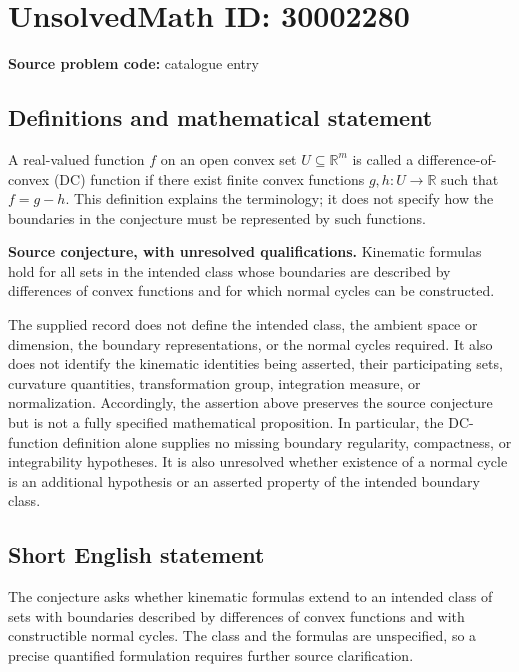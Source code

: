 \documentclass[11pt]{article}
\newcommand{\R}{\mathbb{R}}
\begin{document}
\section*{UnsolvedMath ID: 30002280}
\textbf{Source problem code:} catalogue entry
\subsection{Definitions and mathematical statement}
A real-valued function \(f\) on an open convex set \(U\subseteq\R^m\) is called a difference-of-convex (DC) function if there exist finite convex functions \(g,h:U\to\R\) such that \(f=g-h\). This definition explains the terminology; it does not specify how the boundaries in the conjecture must be represented by such functions.

\textbf{Source conjecture, with unresolved qualifications.} Kinematic formulas hold for all sets in the intended class whose boundaries are described by differences of convex functions and for which normal cycles can be constructed.

The supplied record does not define the intended class, the ambient space or dimension, the boundary representations, or the normal cycles required. It also does not identify the kinematic identities being asserted, their participating sets, curvature quantities, transformation group, integration measure, or normalization. Accordingly, the assertion above preserves the source conjecture but is not a fully specified mathematical proposition. In particular, the DC-function definition alone supplies no missing boundary regularity, compactness, or integrability hypotheses. It is also unresolved whether existence of a normal cycle is an additional hypothesis or an asserted property of the intended boundary class.
\subsection{Short English statement}
The conjecture asks whether kinematic formulas extend to an intended class of sets with boundaries described by differences of convex functions and with constructible normal cycles. The class and the formulas are unspecified, so a precise quantified formulation requires further source clarification.
\end{document}
